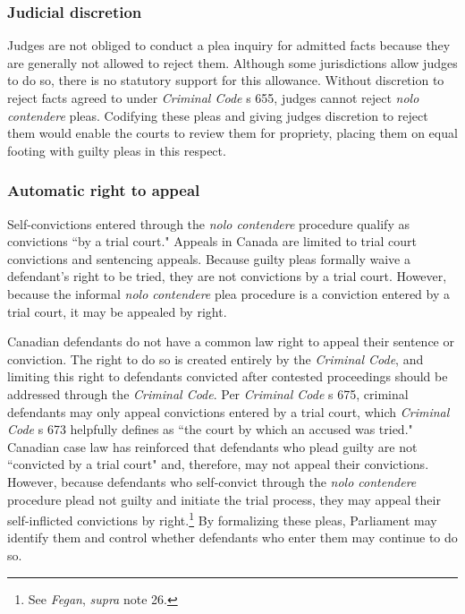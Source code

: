 \subsubsection{Judicial discretion}

Judges are not obliged to conduct a plea inquiry for admitted facts because they are generally not allowed to reject them. Although some jurisdictions allow judges to do so, there is no statutory support for this allowance. Without discretion to reject facts agreed to under \textit{Criminal Code} s 655, judges cannot reject \textit{nolo contendere} pleas. Codifying these pleas and giving judges discretion to reject them would enable the courts to review them for propriety, placing them on equal footing with guilty pleas in this respect.

\subsubsection{Automatic right to appeal}

Self-convictions entered through the \textit{nolo contendere} procedure qualify as convictions ``by a trial court." Appeals in Canada are limited to trial court convictions and sentencing appeals. Because guilty pleas formally waive a defendant's right to be tried, they are not convictions by a trial court. However, because the informal \textit{nolo contendere} plea procedure is a conviction entered by a trial court, it may be appealed by right.

Canadian defendants do not have a common law right to appeal their sentence or conviction. The right to do so is created entirely by the \textit{Criminal Code}, and limiting this right to defendants convicted after contested proceedings should be addressed through the \textit{Criminal Code}. Per \textit{Criminal Code} s 675, criminal defendants may only appeal convictions entered by a trial court, which \textit{Criminal Code} s 673 helpfully defines as ``the court by which an accused was tried." Canadian case law has reinforced that defendants who plead guilty are not ``convicted by a trial court" and, therefore, may not appeal their convictions. However, because defendants who self-convict through the \textit{nolo contendere} procedure plead not guilty and initiate the trial process, they may appeal their self-inflicted convictions by right.\footnote{See \textit{Fegan}, \textit{supra} note 26.}  By formalizing these pleas, Parliament may identify them and control whether defendants who enter them may continue to do so.

